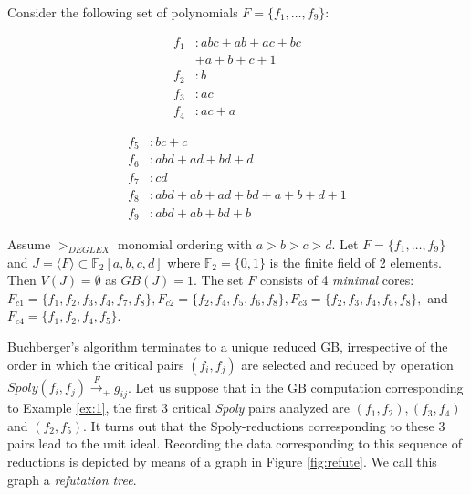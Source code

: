 \begin{Example}
\label{ex:1}
Consider the following set of polynomials $F = \{f_1,\dots, f_9\}$:

\begin{minipage}{2in}
\begin{align*}
f_1&: abc + ab + ac + bc \\
   & + a + b + c + 1\\
f_2&: b\\
f_3&: ac\\
f_4&: ac + a
\end{align*}
\end{minipage}
\begin{minipage}{3in}
\begin{align*}
f_5&: bc + c\\
f_6&: abd + ad + bd + d\\
f_7&: cd\\
f_8&: abd + ab + ad + bd + a + b + d + 1\\
f_9&: abd + ab +bd + b
\end{align*}
\end{minipage}



Assume $>_{DEGLEX}$ monomial ordering with $a>b>c>d$. 
Let $F = \{f_1,\dots,f_9\}$ and 
$J = \langle F \rangle \subset \mathbb{F}_2[a,b,c,d]$ where
$\mathbb{F}_2 = \{0, 1\}$ is the finite field of 2 elements. Then 
$V(J) = \emptyset$ as $GB(J) = 1$.  The set $F$ consists of 4 {\it minimal}
cores: $F_{c1} = \{ f_1,f_2,f_3,f_4,f_7,f_8\}, F_{c2} = \{
f_2,f_4,f_5,f_6,f_8\}, F_{c3} = \{ f_2,f_3,f_4,f_6,f_8\},$ and $F_{c4}
= \{ f_1,f_2,f_4,f_5\}$. 
\end{Example}

Buchberger's algorithm terminates to a unique reduced GB, irrespective
of the order in which the critical pairs $(f_i,f_j)$ are selected and reduced by operation
$Spoly(f_i,f_j)\xrightarrow{F}_+g_{ij}$. Let us suppose that in the GB
computation corresponding to Example \ref{ex:1}, the first 3 critical
{\it Spoly} pairs analyzed are $(f_1, f_2), (f_3, f_4)$ and
$(f_2,f_5)$. It turns out that the Spoly-reductions corresponding to
these 3 pairs lead to the unit ideal. Recording the data
corresponding to this sequence of reductions is depicted by means of a
graph in Figure \ref{fig:refute}. We call this graph a {\it refutation tree}. 


